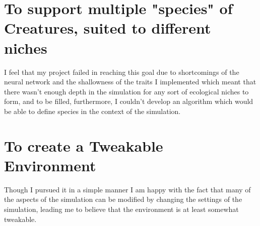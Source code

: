 \section{To support multiple "species" of Creatures, suited to different niches}
I feel that my project failed in reaching this goal due to shortcomings of the neural network and the shallowness of the traits I implemented which meant that there wasn't enough depth in the simulation for any sort of ecological niches to form, and to be filled, furthermore, I couldn't develop an algorithm which would be able to define species in the context of the simulation.
\section{To create a Tweakable Environment}
Though I pursued it in a simple manner I am happy with the fact that many of the aspects of the simulation can be modified by changing the settings of the simulation, leading me to believe that the environment is at least somewhat tweakable.